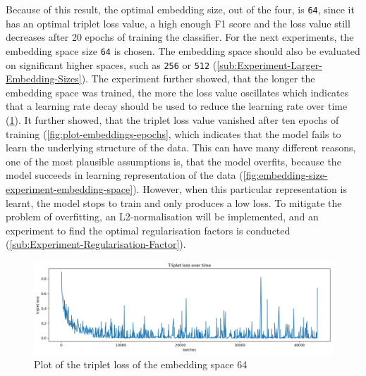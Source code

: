 \newline
\newline
\noindent
Because of this result, the optimal embedding size, out of the four, is \texttt{64}, since it has an optimal triplet loss value, a high enough F1 score and the loss value still decreases after 20 epochs of training the classifier. For the next experiments, the embedding space size \texttt{64} is chosen. The embedding space should also be evaluated on significant higher spaces, such as \texttt{256} or \texttt{512} (\ref{sub:Experiment-Larger-Embedding-Sizes}).
\newline
\newline
The experiment further showed, that the longer the embedding space was trained, the more the loss value oscillates which indicates that a learning rate decay should be used to reduce the learning rate over time (\ref{fig:plot-triplet-64}). It further showed, that the triplet loss value vanished after ten epochs of training (\ref{fig:plot-embeddings-epochs}, which indicates that the model fails to learn the underlying structure of the data. This can have many different reasons, one of the most plausible assumptions is, that the model overfits, because the model succeeds in learning representation of the data (\ref{fig:embedding-size-experiment-embedding-space}). However, when this particular representation is learnt, the model stops to train and only produces a low loss. To mitigate the problem of overfitting, an L2-normalisation will be implemented, and an experiment to find the optimal regularisation factors is conducted (\ref{sub:Experiment-Regularisation-Factor}).
\begin{figure}[htb]
\centering
    \includegraphics[width=0.95\linewidth]{img/experiment_embedding_size_triplet_loss.png}
    \caption{Plot of the triplet loss of the embedding space 64}
    \label{fig:plot-triplet-64}
\end{figure}

